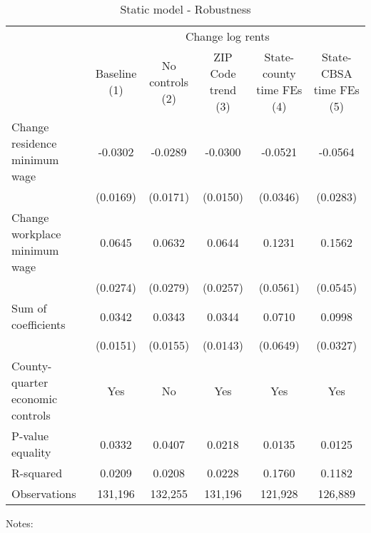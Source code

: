 \begin{table}
    \caption{Static model - Robustness}
    \label{tab:static_robust}

    \begin{tabular}{@{}lccccc@{}}
        \toprule
                                                  & \multicolumn{5}{c}{Change log rents}                                          \\ \cmidrule(l){2-6} 
                                                  & \shortsack{Baseline\\ (1)}        & \shortsack{No controls\\ (2)} 
                                                  & \shortsack{ZIP Code trend\\ (3)}  & \shortsack{State-county time FEs\\ (4)} 
                                                  & \shortsack{State-CBSA time FEs\\ (5)}                                         \\ \midrule
        Change residence minimum wage             & -0.0302      & -0.0289         & -0.0300       & -0.0521        & -0.0564                         \\
                                                  & (0.0169)    & (0.0171)       & (0.0150)     & (0.0346)      & (0.0283)                       \\
        Change workplace minimum wage             & 0.0645      & 0.0632         & 0.0644       & 0.1231        & 0.1562                         \\
                                                  & (0.0274)    & (0.0279)       & (0.0257)     & (0.0561)      & (0.0545)                       \\
        Sum of coefficients                       & 0.0342      & 0.0343         & 0.0344       & 0.0710        & 0.0998                         \\
                                                  & (0.0151)    & (0.0155)       & (0.0143)     & (0.0649)      & (0.0327)                       \\ \midrule
        County-quarter economic controls          & Yes      &  No         & Yes       & Yes        & Yes                         \\
        P-value equality                          & 0.0332      & 0.0407         & 0.0218       & 0.0135        & 0.0125                         \\
        R-squared                                 & 0.0209      & 0.0208         & 0.0228       & 0.1760        & 0.1182                         \\
        Observations                              & 131,196     & 132,255        & 131,196      & 121,928       & 126,889                        \\ \bottomrule
    \end{tabular}

    \begin{minipage}{.95\textwidth} \footnotesize
        \vspace{2mm}
        Notes: 
    \end{minipage}
\end{table}
